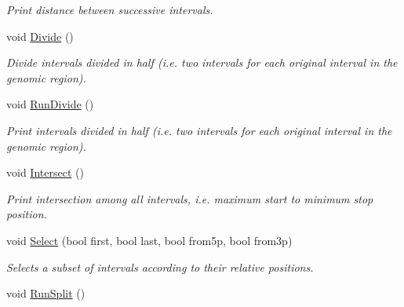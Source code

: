 \begin{CompactItemize}
\begin{CompactList}\small\item\em Print distance between successive intervals. \item\end{CompactList}\item 
\hypertarget{classGenomicRegionGFF_77975c03dd39b404098eb519e81f67d4}{
void \hyperlink{classGenomicRegionGFF_77975c03dd39b404098eb519e81f67d4}{Divide} ()}
\label{classGenomicRegionGFF_77975c03dd39b404098eb519e81f67d4}

\begin{CompactList}\small\item\em Divide intervals divided in half (i.e. two intervals for each original interval in the genomic region). \item\end{CompactList}\item 
\hypertarget{classGenomicRegionGFF_d4acc1231677efd876084ef36db82de1}{
void \hyperlink{classGenomicRegionGFF_d4acc1231677efd876084ef36db82de1}{RunDivide} ()}
\label{classGenomicRegionGFF_d4acc1231677efd876084ef36db82de1}

\begin{CompactList}\small\item\em Print intervals divided in half (i.e. two intervals for each original interval in the genomic region). \item\end{CompactList}\item 
\hypertarget{classGenomicRegionGFF_d35d9b6e9c57270c0d5648ae9f702959}{
void \hyperlink{classGenomicRegionGFF_d35d9b6e9c57270c0d5648ae9f702959}{Intersect} ()}
\label{classGenomicRegionGFF_d35d9b6e9c57270c0d5648ae9f702959}

\begin{CompactList}\small\item\em Print intersection among all intervals, i.e. maximum start to minimum stop position. \item\end{CompactList}\item 
\hypertarget{classGenomicRegionGFF_aa9b1271561e2d62ef1be6464e589cf4}{
void \hyperlink{classGenomicRegionGFF_aa9b1271561e2d62ef1be6464e589cf4}{Select} (bool first, bool last, bool from5p, bool from3p)}
\label{classGenomicRegionGFF_aa9b1271561e2d62ef1be6464e589cf4}

\begin{CompactList}\small\item\em Selects a subset of intervals according to their relative positions. \item\end{CompactList}\item 
\hypertarget{classGenomicRegionGFF_bc08552b0ad4ca512f79064b8cd64e54}{
void \hyperlink{classGenomicRegionGFF_bc08552b0ad4ca512f79064b8cd64e54}{RunSplit} ()}
\label{classGenomicRegionGFF_bc08552b0ad4ca512f79064b8cd64e54}


\end{CompactItemize}

